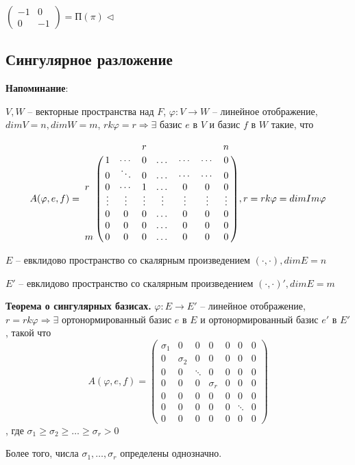 $\begin{pmatrix} -1 & 0 \\ 0 & -1 \end{pmatrix} = П(\pi) \lhd$

\subsection{Сингулярное разложение}

\textbf{Напоминание}:

$V, W$ -- векторные пространства над $F$, $\varphi: V \rightarrow W$ -- линейное отображение, $dim V = n, dim W = m$, $rk \varphi = r \Rightarrow \exists$ базис $e$ в $V$ и базис $f$ в $W$ такие, что 

\[ A(\varphi, e, f) = \bordermatrix{ 
    	 & & & r & & & & n \cr
    	 & 1 & \cdots & 0 & \dots & \cdots & \cdots & 0 \cr 
         & 0 & \ddots & 0 & \dots & \cdots & \cdots & 0 \cr
		r & 0 & \cdots & 1 & \dots & 0 & 0 & 0  \cr
         & \vdots & \vdots & \vdots & \vdots & \vdots & \vdots & \vdots \cr
        & 0 & 0 & 0 & \dots & 0 & 0 & 0  \cr
        & 0 & 0 & 0 & \dots & 0 & 0 & 0  \cr
       m & 0 & 0 & 0 & \dots  & 0 & 0 & 0 }, r = rk \varphi = dim Im \varphi
\]

\vspace{\baselineskip}
$E$ -- евклидово пространство со скалярным произведением $(\cdot, \cdot), dimE = n$

$E'$ -- евклидово пространство со скалярным произведением $(\cdot, \cdot)', dimE = m$

\vspace{\baselineskip}
\textbf{Теорема о сингулярных базисах.} $\varphi: E \rightarrow E'$ -- линейное отображение, $r = rk \varphi \Rightarrow \exists$ ортонормированный базис $e$ в $E$ и ортонормированный базис $e'$ в $E'$, такой что \[A(\varphi, e, f) = \begin{pmatrix} \sigma_1 & 0 & 0 & 0 & 0 & 0 & 0 \\  0 & \sigma_2 & 0 & 0 & 0 & 0 & 0 \\ 0 & 0 & \ddots & 0 & 0 & 0 & 0 \\ 0 & 0 & 0 & \sigma_r & 0 & 0 & 0 \\ 0 & 0 & 0 & 0 & 0 & 0 & 0 \\ 0 & 0 & 0 & 0 & 0 & \ddots & 0 \\ 0 & 0 & 0 & 0 & 0 & 0 & 0  \end{pmatrix}\], где $\sigma_1 \geqslant \sigma_2 \geqslant \dots \geqslant \sigma_r > 0$

Более того, числа $\sigma_1, \dots, \sigma_r$ определены однозначно.

